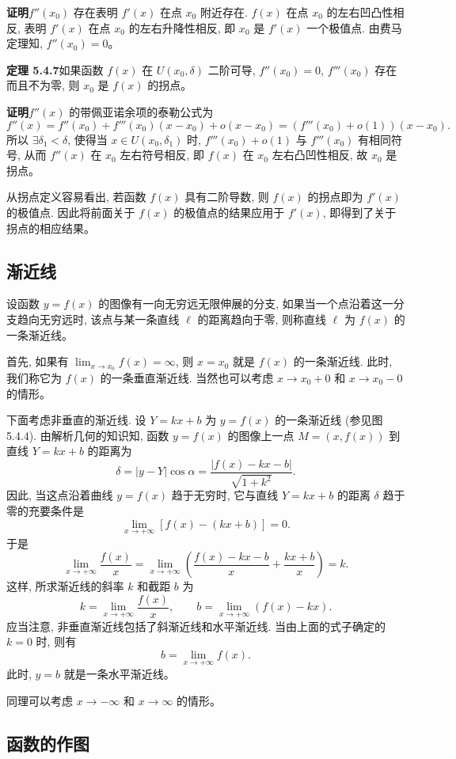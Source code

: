 \documentclass[UTF8, 12pt, fontset=fandol, oneside]{ctexart}
\begin{document}
\noindent\textbf{证明}\quad $f''(x_0)$ 存在表明 $f'(x)$ 在点 $x_0$ 附近存在. $f(x)$ 在点 $x_0$ 的左右凹凸性相反, 表明 $f'(x)$ 在点 $x_0$ 的左右升降性相反, 即 $x_0$ 是 $f'(x)$ 一个极值点. 由费马定理知, $f''(x_0)=0$。

\noindent\textbf{定理 5.4.7}\quad 如果函数 $f(x)$ 在 $U(x_0,\delta)$ 二阶可导, $f''(x_0)=0$, $f'''(x_0)$ 存在而且不为零, 则 $x_0$ 是 $f(x)$ 的拐点。

\noindent\textbf{证明}\quad $f''(x)$ 的带佩亚诺余项的泰勒公式为
\[
  f''(x)=f''(x_0)+f'''(x_0)(x-x_0)+o(x-x_0)
  =(f'''(x_0)+o(1))(x-x_0).
\]
所以 $\exists\delta_1<\delta$, 使得当 $x\in U(x_0,\delta_1)$ 时, $f'''(x_0)+o(1)$ 与 $f'''(x_0)$ 有相同符号, 从而 $f''(x)$ 在 $x_0$ 左右符号相反, 即 $f(x)$ 在 $x_0$ 左右凸凹性相反, 故 $x_0$ 是拐点。

从拐点定义容易看出, 若函数 $f(x)$ 具有二阶导数, 则 $f(x)$ 的拐点即为 $f'(x)$ 的极值点. 因此将前面关于 $f(x)$ 的极值点的结果应用于 $f'(x)$, 即得到了关于拐点的相应结果。

\subsection{渐近线}

设函数 $y=f(x)$ 的图像有一向无穷远无限伸展的分支, 如果当一个点沿着这一分支趋向无穷远时, 该点与某一条直线 $\ell$ 的距离趋向于零, 则称直线 $\ell$ 为 $f(x)$ 的一条渐近线。

首先, 如果有 $\lim_{x\to x_0}f(x)=\infty$, 则 $x=x_0$ 就是 $f(x)$ 的一条渐近线. 此时, 我们称它为 $f(x)$ 的一条垂直渐近线. 当然也可以考虑 $x\to x_0+0$ 和 $x\to x_0-0$ 的情形。

下面考虑非垂直的渐近线. 设 $Y=kx+b$ 为 $y=f(x)$ 的一条渐近线 (参见图 5.4.4). 由解析几何的知识知, 函数 $y=f(x)$ 的图像上一点 $M=(x,f(x))$ 到直线 $Y=kx+b$ 的距离为
\[
  \delta=|y-Y|\cos\alpha=\frac{|f(x)-kx-b|}{\sqrt{1+k^2}}.
\]
因此, 当这点沿着曲线 $y=f(x)$ 趋于无穷时, 它与直线 $Y=kx+b$ 的距离 $\delta$ 趋于零的充要条件是
\[
  \lim_{x\to+\infty}[f(x)-(kx+b)]=0.
\]
于是
\[
  \lim_{x\to+\infty}\frac{f(x)}x
  =\lim_{x\to+\infty}\left(\frac{f(x)-kx-b}{x}+\frac{kx+b}{x}\right)=k.
\]
这样, 所求渐近线的斜率 $k$ 和截距 $b$ 为
\[
  k=\lim_{x\to+\infty}\frac{f(x)}x,\qquad
  b=\lim_{x\to+\infty}(f(x)-kx).
\]
应当注意, 非垂直渐近线包括了斜渐近线和水平渐近线. 当由上面的式子确定的 $k=0$ 时, 则有
\[
  b=\lim_{x\to+\infty}f(x).
\]
此时, $y=b$ 就是一条水平渐近线。

同理可以考虑 $x\to-\infty$ 和 $x\to\infty$ 的情形。

\subsection{函数的作图}
\end{document}
